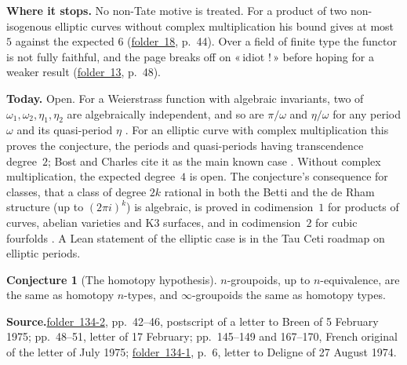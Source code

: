 \documentclass[11pt]{article}
\newcommand{\q}[1]{«\,#1\,»}
\newcommand{\fac}[1]{\href{https://grothendieck.umontpellier.fr/#1.pdf}{folder~#1}}
\theoremstyle{definition}
\theoremstyle{plain}\newtheorem*{proposition}{Proposition}\theoremstyle{definition}
\newtheorem{bigconj}{Conjecture}
\newcommand{\entry}[1]{\par\medskip\noindent\textbf{#1}\enspace}
\newcommand{\src}[1]{\entry{Source.}#1}
\begin{document}
\entry{Where it stops.} No non-Tate motive is treated. For a product of two non-isogenous elliptic curves without complex multiplication his bound gives at most $5$ against the expected $6$ (\fac{18}, p.~44). Over a field of finite type the functor is not fully faithful, and the page breaks off on \q{idiot !} before hoping for a weaker result (\fac{13}, p.~48).

\entry{Today.} Open. For a Weierstrass function with algebraic invariants, two of $\omega_1, \omega_2, \eta_1, \eta_2$ are algebraically independent, and so are $\pi/\omega$ and $\eta/\omega$ for any period $\omega$ and its quasi-period $\eta$ \cite[\S2\,A, Th.~1 and~3]{chudnovsky1980}. For an elliptic curve with complex multiplication this proves the conjecture, the periods and quasi-periods having transcendence degree~$2$; Bost and Charles cite it as the main known case \cite[\S2.2.2]{bostcharles}. Without complex multiplication, the expected degree~$4$ is open. The conjecture's consequence for classes, that a class of degree $2k$ rational in both the Betti and the de Rham structure (up to $(2\pi i)^k$) is algebraic, is proved in codimension~$1$ for products of curves, abelian varieties and K3 surfaces, and in codimension~$2$ for cubic fourfolds \cite[Cor.~3.9, 3.10, Th.~5.6]{bostcharles}. A Lean statement of the elliptic case is in the Tau Ceti roadmap on elliptic periods.

\begin{bigconj}[The homotopy hypothesis]\label{c:hh}
$n$-groupoids, up to $n$-equivalence, are the same as homotopy $n$-types, and $\infty$-groupoids the same as homotopy types.
\end{bigconj}

\src{\fac{134-2}, pp.~42--46, postscript of a letter to Breen of 5 February 1975; pp.~48--51, letter of 17 February; pp.~145--149 and 167--170, French original of the letter of July 1975; \fac{134-1}, p.~6, letter to Deligne of 27 August 1974.}
\end{document}
